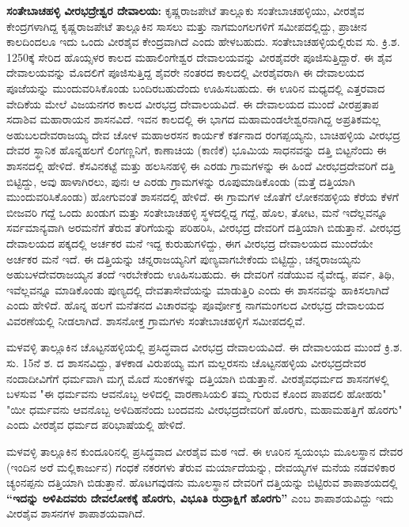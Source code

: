 \textbf{ಸಂತೇಬಾಚಹಳ್ಳಿ ವೀರಭದ್ರೇಶ್ವರ ದೇವಾಲಯ:} ಕೃಷ್ಣರಾಜಪೇಟೆ ತಾಲ್ಲೂಕು ಸಂತೇಬಾಚಹಳ್ಳಿಯು, ವೀರಶೈವ ಕೇಂದ್ರಗಳಾಗಿದ್ದ ಕೃಷ್ಣರಾಜಪೇಟೆ ತಾಲ್ಲೂಕಿನ ಸಾಸಲು ಮತ್ತು ನಾಗಮಂಗಲಗಳಿಗೆ ಸಮೀಪದಲ್ಲಿದ್ದು, ಪ್ರಾಚೀನ ಕಾಲದಿಂದಲೂ ಇದು ಒಂದು ವೀರಶೈವ ಕೇಂದ್ರವಾಗಿದೆ ಎಂದು ಹೇಳಬಹುದು. ಸಂತೇಬಾಚಹಳ್ಳಿಯಲ್ಲಿರುವ ಸು. ಕ್ರಿ.ಶ. 1250ಕ್ಕೆ ಸೇರಿದ ಹೊಯ್ಸಳರ ಕಾಲದ ಮಹಾಲಿಂಗೇಶ್ವರ ದೇವಾಲಯವನ್ನು ವೀರಶೈವರೇ ಪೂಜಿಸುತ್ತಿದ್ದಾರೆ. ಈ ಶೈವ ದೇವಾಲಯವನ್ನು ಮೊದಲಿಗೆ ಪೂಜಿಸುತ್ತಿದ್ದ ಶೈವರೇ ನಂತರದ ಕಾಲದಲ್ಲಿ ವೀರಶೈವರಾಗಿ ಈ ದೇವಾಲಯದ ಪೂಜೆಯನ್ನು ಮುಂದುವರಿಸಿಕೊಂಡು ಬಂದಿರಬಹುದೆಂದು ಊಹಿಸಬಹುದು. ಈ ಊರಿನ ಮಧ್ಯದಲ್ಲಿ ಎತ್ತರವಾದ ವೇದಿಕೆಯ ಮೇಲೆ ವಿಜಯನಗರ ಕಾಲದ ವೀರಭದ್ರ ದೇವಾಲಯವಿದೆ. ಈ ದೇವಾಲಯದ ಮುಂದೆ ವೀರಪ್ರತಾಪ ಸದಾಶಿವ ಮಹಾರಾಯನ ಶಾಸನವಿದೆ. ಇವನ ಕಾಲದಲ್ಲಿ ಈ ಭಾಗದ ಮಹಾಮಂಡಲೇಶ್ವರನಾಗಿದ್ದ ಅಪ್ರತಿಕಮಲ್ಲ ಅಹುಬಲದೇವರಾಜಯ್ಯ ದೇವ ಚೋಳ ಮಹಾಅರಸನ ಕಾರ್ಯಕೆ ಕರ್ತನಾದ ರಂಗಪ್ಪಯ್ಯನು, ಬಾಚಿಹಳ್ಳಿಯ ವೀರಭದ್ರ ದೇವರ ಸ್ಥಾನಿಕ ಹೊನ್ನಹಲಗೆ ಲಿಂಗಣ್ಣನಿಗೆ, ಕಾಣಾಚಿಯ (ಕಾಣಿಕೆ) ಭೂಮಿಯ ಸಾಧನವನ್ನು ದತ್ತಿ ಬಿಟ್ಟನೆಂದು ಈ ಶಾಸನದಲ್ಲಿ ಹೇಳಿದೆ. ಕೆಸವಿನಕಟ್ಟೆ ಮತ್ತು ಹಲಸಿನಹಳ್ಳಿ ಈ ಎರಡು ಗ್ರಾಮಗಳನ್ನು ಈ ಹಿಂದೆ ವೀರಭದ್ರದೇವರಿಗೆ ದತ್ತಿ ಬಿಟ್ಟಿದ್ದು, ಅವು ಹಾಳಾಗಿರಲು, ಪುನಃ ಆ ಎರಡು ಗ್ರಾಮಗಳನ್ನು ರೂಪುಮಾಡಿಕೊಂಡು (ಮತ್ತೆ ದತ್ತಿಯಾಗಿ ಮುಂದುವರಿಸಿಕೊಂಡು) ಹೋಗುವಂತೆ ಶಾಸನದಲ್ಲಿ ಹೇಳಿದೆ. ಈ ಗ್ರಾಮಗಳ ಜೊತೆಗೆ ಲೋಕನಹಳ್ಳಿಯ ಕೆರೆಯ ಕೆಳಗೆ ಬೀಜವರಿ ಗದ್ದೆ ಒಂದು ಖಂಡುಗ ಮತ್ತು ಸಂತೇಬಾಚಹಳ್ಳಿ ಸ್ಥಳದಲ್ಲಿದ್ದ ಗದ್ದೆ, ಹೊಲ, ತೋಟ, ಮನೆ ಇದೆಲ್ಲವನ್ನೂ ಸರ್ವಮಾನ್ಯವಾಗಿ ಅರಮನೆಗೆ ತೆರುವ ತೆರಿಗೆಯನ್ನು ಪರಿಹರಿಸಿ, ವೀರಭದ್ರ ದೇವರಿಗೆ ದತ್ತಿಯಾಗಿ ಬಿಡುತ್ತಾನೆ. ವೀರಭದ್ರ ದೇವಾಲಯದ ಪಕ್ಕದಲ್ಲಿ ಅರ್ಚಕರ ಮನೆ ಇದ್ದ ಕುರುಹುಗಳಿದ್ದು, ಈಗ ವೀರಭದ್ರ ದೇವಾಲಯದ ಮುಂದೆಯೇ ಅರ್ಚಕರ ಮನೆ ಇದೆ. ಈ ದತ್ತಿಯನ್ನು ಚನ್ನರಾಜಯ್ಯನಿಗೆ ಪುಣ್ಯವಾಗಬೇಕೆಂದು ಬಿಟ್ಟಿದ್ದು, ಚನ್ನರಾಜಯ್ಯನು ಅಹುಬಳದೇವರಾಜಯ್ಯನ ತಂದೆ ಇರಬೇಕೆಂದು ಊಹಿಸಬಹುದು. ಈ ದೇವರಿಗೆ ನಡೆಯುವ ನೈವೇದ್ಯ, ಪರ್ವ, ತಿಥಿ, ಇವೆಲ್ಲವನ್ನೂ ಮಾಡಿಕೊಂಡು ಪುಣ್ಯದಲ್ಲಿ ದೇವತಾಸೇವೆಯನ್ನು ಮಾಡುತ್ತಿರಿ ಎಂದು ಈ ಶಾಸನವನ್ನು ಹಾಕಿಸಲಾಗಿದೆ ಎಂದು ಹೇಳಿದೆ. ಹೊನ್ನ ಹಲಗೆ ಮನೆತನದ ವಿಚಾರವನ್ನು ಪೂರ್ವೋಕ್ತ ನಾಗಮಂಗಲದ ವೀರಭದ್ರ ದೇವಾಲಯದ ವಿವರಣೆಯಲ್ಲಿ ನೀಡಲಾಗಿದೆ. ಶಾಸನೋಕ್ತ ಗ್ರಾಮಗಳು ಸಂತೇಬಾಚಹಳ್ಳಿಗೆ ಸಮೀಪದಲ್ಲಿವೆ.

ಮಳವಳ್ಳಿ ತಾಲ್ಲೂಕಿನ ಚೊಟ್ಟನಹಳ್ಳಿಯಲ್ಲಿ ಪ್ರಸಿದ್ಧವಾದ ವೀರಭದ್ರ ದೇವಾಲಯವಿದೆ. ಈ ದೇವಾಲಯದ ಮುಂದೆ ಕ್ರಿ.ಶ. ಸು. 15ನೆ ಶ. ದ ಶಾಸನವಿದ್ದು, ತಳಕಾಡ ವಿರುಪಯ್ಯ ಮಗ ಮಲ್ಲರಸನು ಚೊಟ್ಟನಹಳ್ಳಿಯ ವೀರಭದ್ರದೇವರ ನಂದಾದೀವಿಗೆಗೆ ಧರ್ಮವಾಗಿ ಮಗ್ಗ ಮೊದೆ ಸುಂಕಗಳನ್ನು ದತ್ತಿಯಾಗಿ ಬಿಡುತ್ತಾನೆ. ವೀರಶೈವಧರ್ಮದ ಶಾಸನಗಳಲ್ಲಿ ಬಳಸುವ "ಈ ಧರ್ಮವನು ಆವನೊಬ್ಬ ಅಳಿದಲ್ಲಿ ವಾರಣಾಸಿಯಲಿ ತಮ್ಮ ಗುರುವ ಕೊಂದ ಪಾಪದಲಿ ಹೋಹರು" "ಯೀ ಧರ್ಮವನು ಆವನೊಬ್ಬ ಅಳಿದಿಹನೆಂದು ಬಂದವನು ವೀರಭದ್ರದೇವರಿಗೆ ಹೊರಗು, ಮಹಾಮಹತ್ತಿಗೆ ಹೊರಗು" ಎಂದು ವೀರಶೈವ ಧರ್ಮದ ಪರಿಭಾಷೆಯಲ್ಲಿ ಹೇಳಿದೆ.

ಮಳವಳ್ಳಿ ತಾಲ್ಲೂಕಿನ ಕುಂದೂರಿನಲ್ಲಿ ಪ್ರಸಿದ್ಧವಾದ ವೀರಶೈವ ಮಠ ಇದೆ. ಈ ಊರಿನ ಸ್ವಯಂಭು ಮೂಲಸ್ಥಾನ ದೇವರ (ಇಂದಿನ ಅರೆ ಮಲ್ಲಿಕಾರ್ಜುನ) ಗಂಧಕೆ ನಕರಗಳು ತೆರುವ ಮರ್ಯಾದೆಯನ್ನು, ದೇವಯ್ಯಗಳ ಮನೆಯ ನಡವಳಿಕಾರ ಚ್ಯಂನಪ್ಪನು ದತ್ತಿಯಾಗಿ ಬಿಡುತ್ತಾನೆ. ಹೊಟಗವುಡನು ಮೂಲಸ್ಥಾನ ದೇವರಿಗೆ ದತ್ತಿಯನ್ನು ಬಿಟ್ಟಿರುವ ಶಾಪಾಶಯದಲ್ಲಿ \textbf{“ಇದನ್ನು ಅಳಿಪಿದವರು ದೇವಲೋಕಕ್ಕೆ ಹೊರಗು, ವಿಭೂತಿ ರುದ್ರಾಕ್ಷಿಗೆ ಹೊರಗು”} ಎಂಬ ಶಾಪಾಶಯವಿದ್ದು ಇದು ವೀರಶೈವ ಶಾಸನಗಳ ಶಾಪಾಶಯ\-ವಾಗಿದೆ.

